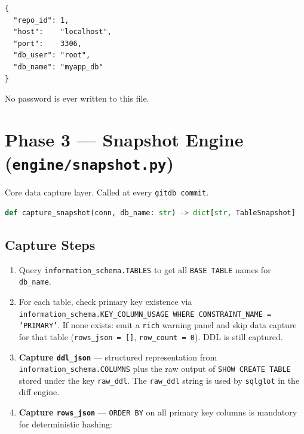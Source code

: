 \documentclass[12pt, a4paper]{article}
\begin{document}
\begin{tcolorbox}[commandbox, title=\texttt{.gitdb/config.json} --- written by \texttt{gitdb init}]
\begin{lstlisting}[language={}]
{
  "repo_id": 1,
  "host":    "localhost",
  "port":    3306,
  "db_user": "root",
  "db_name": "myapp_db"
}
\end{lstlisting}
\textcolor{codetext}{\small No password is ever written to this file.}
\end{tcolorbox}

\section{Phase 3 --- Snapshot Engine (\texttt{engine/snapshot.py})}

Core data capture layer. Called at every \texttt{gitdb commit}.

\begin{tcolorbox}[commandbox, title=Function Signature]
\begin{lstlisting}[language=Python]
def capture_snapshot(conn, db_name: str) -> dict[str, TableSnapshot]
\end{lstlisting}
\end{tcolorbox}

\subsection{Capture Steps}

\begin{enumerate}[leftmargin=1.5em, itemsep=0.3em]
    \item Query \texttt{information\_schema.TABLES} to get all
    \texttt{BASE TABLE} names for \texttt{db\_name}.

    \item For each table, check primary key existence via
    \texttt{information\_schema.KEY\_COLUMN\_USAGE WHERE CONSTRAINT\_NAME =
    'PRIMARY'}. If none exists: emit a \texttt{rich} warning panel and skip
    data capture for that table (\texttt{rows\_json = []},
    \texttt{row\_count = 0}). DDL is still captured.

    \item \textbf{Capture \texttt{ddl\_json}} --- structured representation
    from \texttt{information\_schema.COLUMNS} plus the raw output of
    \texttt{SHOW CREATE TABLE} stored under the key \texttt{raw\_ddl}.
    The \texttt{raw\_ddl} string is used by \texttt{sqlglot} in the diff engine.

    \item \textbf{Capture \texttt{rows\_json}} --- \texttt{ORDER BY} on all
    primary key columns is mandatory for deterministic hashing:
\end{enumerate}
\end{document}
